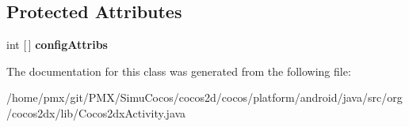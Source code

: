 \subsection*{Protected Attributes}
\begin{DoxyCompactItemize}
\item 
\mbox{\label{classorg_1_1cocos2dx_1_1lib_1_1Cocos2dxActivity_1_1Cocos2dxEGLConfigChooser_ac7aecbbbd3276e16af8356535519f79a}} 
int \mbox{[}$\,$\mbox{]} {\bfseries config\+Attribs}
\end{DoxyCompactItemize}


The documentation for this class was generated from the following file\+:\begin{DoxyCompactItemize}
\item 
/home/pmx/git/\+P\+M\+X/\+Simu\+Cocos/cocos2d/cocos/platform/android/java/src/org/cocos2dx/lib/Cocos2dx\+Activity.\+java\end{DoxyCompactItemize}
